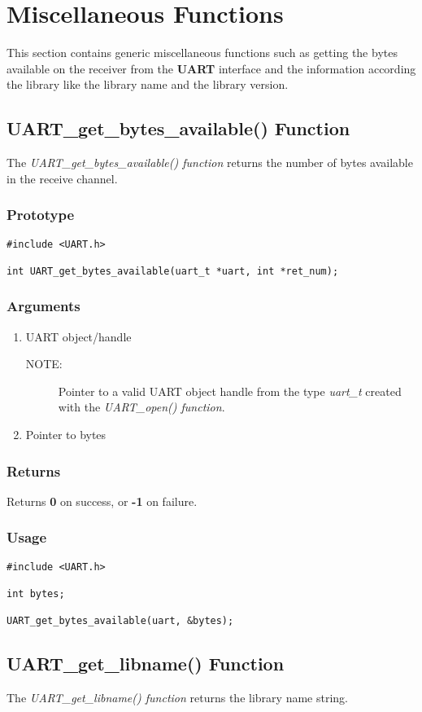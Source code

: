 \documentclass{report}
\begin{document}
\section{Miscellaneous Functions}
This section contains generic miscellaneous functions such as
getting the bytes available on the receiver from the \textbf{UART}
interface and the information according the library like the
library name and the library version.
\subsection{UART\_get\_bytes\_available() Function}
The \textit{UART\_get\_bytes\_available() function} returns the number of
bytes available in the receive channel.
\subsubsection*{Prototype}
\begin{lstlisting}
#include <UART.h>

int UART_get_bytes_available(uart_t *uart, int *ret_num);
\end{lstlisting}
\subsubsection*{Arguments}
\begin{enumerate}
\item UART object/handle
\begin{description}
\item[NOTE:] Pointer to a valid UART object handle from the type \textit{uart\_t}
created with the \textit{UART\_open() function}.
\end{description}
\item Pointer to bytes
\end{enumerate}
\subsubsection*{Returns}
Returns \textbf{0} on success, or \textbf{-1} on failure.
\subsubsection*{Usage}
\begin{lstlisting}
#include <UART.h>

int bytes;

UART_get_bytes_available(uart, &bytes);
\end{lstlisting}
\subsection{UART\_get\_libname() Function}
The \textit{UART\_get\_libname() function} returns the library
name string.
\end{document}
